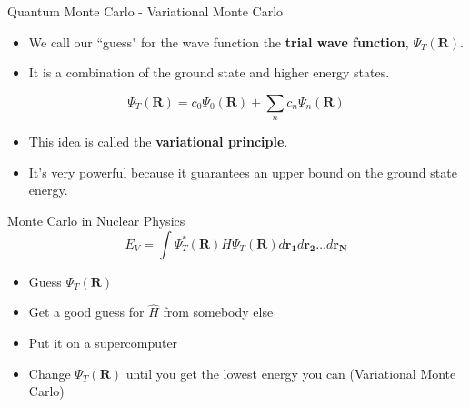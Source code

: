 \documentclass{beamer}
\newcommand{\R}{\mathbf{R}}
\begin{document}
\begin{frame}{Quantum Monte Carlo - Variational Monte Carlo}
\begin{itemize}
   \item We call our ``guess" for the wave function the {\bf trial wave function}, $\Psi_T(\R)$.
   \item It is a combination of the ground state and higher energy states.
\end{itemize}
\begin{equation*}
   \Psi_T(\R) = c_0\Psi_0(\R) + \sum\limits_n c_n\Psi_n(\R)
\end{equation*}
\begin{itemize}
   \item<2-> This idea is called the {\bf variational principle}.
   \item<2-> It's very powerful because it guarantees an upper bound on the ground state energy.
\end{itemize}
\end{frame}

\begin{frame}{Monte Carlo in Nuclear Physics}
\begin{equation*}
   E_V = \int \Psi_T^*(\mathbf{R})H\Psi_T(\mathbf{R}) d\mathbf{r_1}d\mathbf{r_2}\ldots d\mathbf{r_N}
\end{equation*}
\begin{itemize}
   \item Guess $\Psi_T(\R)$
   \item Get a good guess for $\hat{H}$ from somebody else
   \item Put it on a supercomputer
   \item Change $\Psi_T(\R)$ until you get the lowest energy you can (Variational Monte Carlo)
\end{itemize}
\end{frame}
\end{document}
